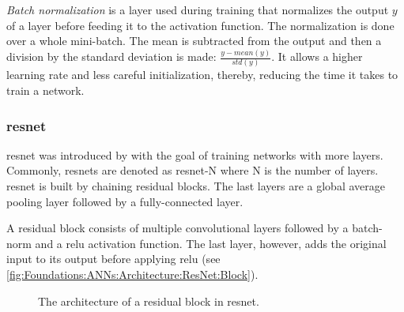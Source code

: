 \emph{Batch normalization} \cite{ioffe2015batch} is a layer used during training that normalizes the output $y$ of a layer before feeding it to the activation function. The normalization is done over a whole mini-batch. The mean is subtracted from the output and then a division by the standard deviation is made: $\frac{y - mean(y)}{std(y)}$. It allows a higher learning rate and less careful initialization, thereby, reducing the time it takes to train a network.


\subsubsection{\acs{resnet}}
\label{sec:Foundations:NeuralNetworks:Architecture:ResNet}

\Ac{resnet} was introduced by \textcite{he2016deep} with the goal of training networks with more layers. Commonly, \acp{resnet} are denoted as \acs{resnet}-N where N is the number of layers. \Ac{resnet} is built by chaining residual blocks. The last layers are a global average pooling layer followed by a fully-connected layer.

A residual block consists of multiple convolutional layers followed by a \ac{batch-norm} and a \ac{relu} activation function. The last layer, however, adds the original input to its output before applying \ac{relu} (see \autoref{fig:Foundations:ANNs:Architecture:ResNet:Block}).

\begin{figure}
    \centering
    \caption{The architecture of a residual block in \acs*{resnet}.}
    \label{fig:Foundations:ANNs:Architecture:ResNet:Block}
\end{figure}


